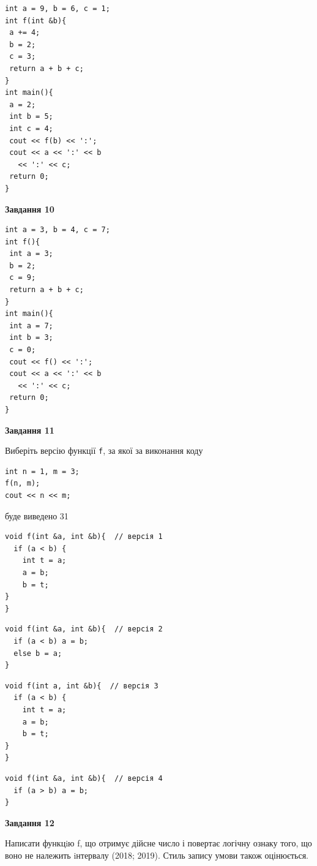 \documentclass[12pt, ukrainian]{article}
\def\code#1{\Verb!#1!}
\begin{document}
{\begin {large}
\begin{minipage}[t]{7.0cm}
\begin{verbatim}
int a = 9, b = 6, c = 1;
int f(int &b){
 a += 4;
 b = 2;
 c = 3;
 return a + b + c;
}
int main(){
 a = 2;
 int b = 5;
 int c = 4;
 cout << f(b) << ':';
 cout << a << ':' << b 
   << ':' << c;
 return 0;
}
\end{verbatim}



\begin{center}
\textbf{Завдання 10}
\end{center}
\vspace{-8mm}

\begin{verbatim}
int a = 3, b = 4, c = 7;
int f(){
 int a = 3;
 b = 2;
 c = 9;
 return a + b + c;
}
int main(){
 int a = 7;
 int b = 3;
 c = 0;
 cout << f() << ':';
 cout << a << ':' << b 
   << ':' << c;
 return 0;
}
\end{verbatim}

\end{minipage}
\vline \hspace{1mm}
\begin{minipage}[t]{11.0cm}

\begin{center}
\textbf{Завдання 11}
\end{center}
Виберіть версію функції \code{f}, за якої за виконання коду
\begin{verbatim}
int n = 1, m = 3;
f(n, m);
cout << n << m;
\end{verbatim}

буде виведено 31

\begin{verbatim}
void f(int &a, int &b){  // версія 1
  if (a < b) {
    int t = a;
    a = b;
    b = t;
}  
}
\end{verbatim}

\vspace{-8mm}\begin{verbatim}
void f(int &a, int &b){  // версія 2
  if (a < b) a = b;
  else b = a;
}
\end{verbatim}

\vspace{-8mm}\begin{verbatim}
void f(int a, int &b){  // версія 3
  if (a < b) {
    int t = a;
    a = b;
    b = t;
}  
}
\end{verbatim}

\vspace{-8mm}\begin{verbatim}
void f(int &a, int &b){  // версія 4
  if (a > b) a = b;
}
\end{verbatim}



\begin{center}
\textbf{Завдання 12}
\end{center}

Написати функцiю f, що отримує дійсне число і повертає логічну ознаку того, що воно не належить iнтервалу (2018; 2019). Стиль запису умови також оцінюється.\par

\end{minipage}

\end {large}}
\end{document}
